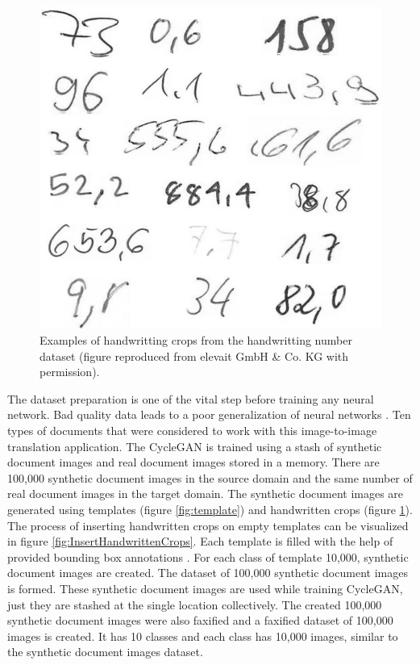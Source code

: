 \begin{figure}[H]
        \begin{center}
    	  \includegraphics[scale=0.45]{images/Implementation/keinwifi.JPG}
	  \caption[Examples of handwritting crops from the handwritting number dataset.]{Examples of handwritting crops from the handwritting number dataset (figure reproduced from elevait GmbH \& Co. KG with permission).}
	  \label{fig:keinwifi}
	  \end{center}
\end{figure}


The dataset preparation is one of the vital step before training any neural network. Bad quality data leads to a poor generalization of neural networks \cite{10.5555/3153997}. Ten types of documents that were considered to work with this image-to-image translation application. The \ac{CycleGAN} is trained using a stash of synthetic document images and real document images stored in a memory. There are 100,000 synthetic document images in the source domain and the same number of real document images in the target domain. The synthetic document images are generated using templates (figure \ref{fig:template}) and handwritten crops (figure \ref{fig:keinwifi}). The process of inserting handwritten crops on empty templates can be visualized in figure \ref{fig:InsertHandwrittenCrops}. Each template is filled with the help of provided bounding box annotations \cite{lin2015microsoft}. For each class of template 10,000, synthetic document images are created. The dataset of 100,000 synthetic document images is formed. These synthetic document images are used while training \ac{CycleGAN}, just they are stashed at the single location collectively. The created 100,000 synthetic document images were also faxified and a faxified dataset of 100,000 images is created. It has 10 classes and each class has 10,000 images, similar to the synthetic document images dataset. 

